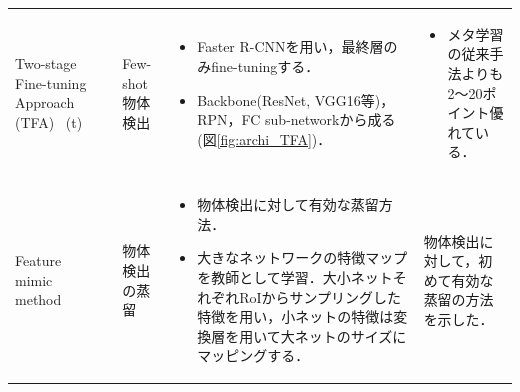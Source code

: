 \documentclass[twocolumn]{jsarticle} %
\begin{document}
\begin{table}
\begin{center}
\begin{tabularx}{\linewidth}{Xp{1.5cm}Xp{7cm}X}
            Two-stage Fine-tuning Approach (TFA) \ (t) 
            \vspace{0.7\baselineskip}
            & \cite{WHGDY20} & Few-shot 物体検出 & 
            \begin{itemize}
                \vspace{-0.7\baselineskip}
                \setlength{\leftskip}{-3mm}
                \item Faster R-CNNを用い，最終層のみfine-tuningする．
                \item Backbone(ResNet, VGG16等)，RPN，FC sub-networkから成る(図\ref{fig:archi_TFA})．
            \end{itemize}
            &
            \begin{itemize}
                \vspace{-0.7\baselineskip}
                \setlength{\leftskip}{-3mm}
                \item メタ学習の従来手法よりも2〜20ポイント優れている．
            \end{itemize}
            \\

            Feature mimic method & \cite{LJY17} & 物体検出の蒸留 & 
            \begin{itemize}
                \vspace{-0.7\baselineskip}
                \setlength{\leftskip}{-3mm}
                \item 物体検出に対して有効な蒸留方法．
                \item 大きなネットワークの特徴マップを教師として学習．大小ネットそれぞれRoIからサンプリングした特徴を用い，小ネットの特徴は変換層を用いて大ネットのサイズにマッピングする．
            \end{itemize}
            & 物体検出に対して，初めて有効な蒸留の方法を示した．\\


\end{tabularx}
\end{center}
\end{table}
\end{document}
